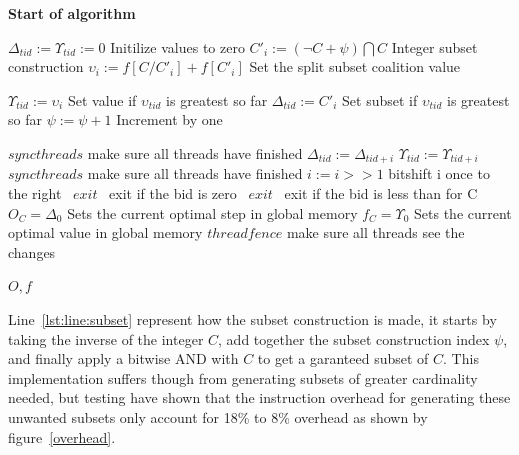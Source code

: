 \documentclass[a4paper, 12pt]{report}
\begin{document}
\textbf{Start of algorithm}
\begin{algorithmic}[1]
\STATE $\Delta _{tid} := \Upsilon _{tid} := 0$ \hfill Initilize values to zero
\IF{$\psi \leq \Psi$} 
\STATE $C'_{i} := (\neg C+\psi) \bigcap C$ \label{lst:line:subset} \hfill Integer subset construction
\STATE $\upsilon _{i} := f[C/C'_{i}]+f[C'_{i}]$ \hfill Set the split subset coalition value
\ENDIF 

\STATE $\Upsilon _{tid} := \upsilon _{i}$  \hfill Set value if $\upsilon _{tid}$ is greatest so far
\STATE $\Delta _{tid} := C'_{i}$ \hfill Set subset if $\upsilon _{tid}$ is greatest so far
\ENDIF
\STATE $\psi := \psi + 1$ \hfill Increment by one
\ENDFOR
\ENDIF

\STATE $syncthreads$ \hfill make sure all threads have finished
 \label{lst:line:mid}
 \label{lst:line:midmid}
 \label{lst:line:midmidmid}
\STATE $\Delta _{tid} := \Delta _{tid+i}$ 
\STATE $\Upsilon _{tid} := \Upsilon _{tid+i}$
\ENDIF
\ENDIF
\STATE $syncthreads$ \hfill make sure all threads have finished
\STATE $i := i >> 1$ \hfill bitshift i once to the right \label{lst:line:midlast}
\ENDFOR \label{lst:line:midend}
 \label{lst:line:last}
\STATE{} \algorithmicthen\ {$ exit$}
\algorithmicend\ \algorithmicif \hfill exit if the bid is zero
\STATE{} \algorithmicthen\ {$ exit$} 
\algorithmicend\ \algorithmicif \hfill exit if the bid is less than for C
  \label{lst:line:lastmid}
\STATE $O_C = \Delta _0$ \hfill Sets the current optimal step in global memory
\STATE $f_C = \Upsilon _0$ \hfill Sets the current optimal value in global memory
\STATE $threadfence$ \hfill make sure all threads see the changes
\ENDIF 

\ENDIF \label{lst:line:lastend}
\RETURN $O,f$
\end{algorithmic}
Line~\ref{lst:line:subset} represent how the subset construction is made, it starts by taking the inverse of the integer $C$, add together the subset construction index $\psi$, and finally apply a bitwise AND with $C$ to get a garanteed subset of $C$. This implementation suffers though from generating subsets of greater cardinality needed, but testing have shown that the instruction overhead for generating these unwanted subsets only account for 18\% to 8\% overhead as shown by figure~\ref{overhead}.\\ 
\end{document}
